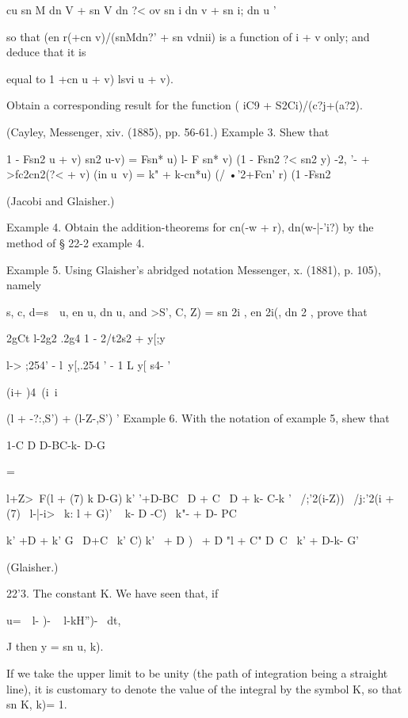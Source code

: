 cu sn M dn V + sn V dn ?< ov sn i  dn v + sn i; dn u ' 

so that (en r(+cn v)/(snMdn?' + sn vdnii) is a function of  i + v only; and deduce that it is 

equal to  1 +cn  u + v) lsvi u + v). 

Obtain a corresponding result for the function ( iC9 + S2Ci)/(c?j+(a?2). 

(Cayley, Messenger, xiv. (1885), pp. 56-61.) 
Example 3. Shew that 

1 - Fsn2  u + v) sn2  u-v) =    Fsn* u) l- F sn* v) (1 - Fsn2 ?< sn2 y) -2, 
 '- + >fc2cn2(?< + v) (in  u~v) =  k"  + k-cn*u) (/ •'2+Fcn'  r) (1 -Fsn2%

(Jacobi and Glaisher.) 

Example 4. Obtain the addition-theorems for cn(-w + r), dn(w-|-'i?) by the method of 
§ 22-2 example 4. 

Example 5. Using Glaisher's abridged notation  Messenger, x. (1881), p. 105), namely 

s, c, d=s\ \  u, en u, dn u, and >S', C, Z) = sn 2i , en 2i(, dn 2 , 
prove that 

2gCt  l-2g2 .2g4 1 - 2/t2s2 + y[;y 

l-> ;254'  - l\ y[,.254 '  - 1 L y[ s4- ' 

(i+ )4\ (i\  i 



(l + -?:,S')  + (l-Z-,S') ' 
Example 6. With the notation of example 5, shew that 

1-C  D D-BC-k-  D-G 



   = 



l+Z>~F(l + (7) k  D-G) k' '+D-BC 
 \  D + C \  D + k- C-k '  \  /;'2(i-Z)) \  /j:'2(i + (7) 
  ~l-|-i>~ k:  l + G)' ~ k- D -C)~ k"- + D- PC 

k' +D + k' G \  D+C \ k'   C) k'  \ + D ) 
\ + D "l + C" D~C ~k'  + D-k- G' 



(Glaisher.) 



22'3. The constant K. 
We have seen that, if 

u=\ \  l- )- ~ l-kH'')- ~dt, 

J 
then y = sn  u, k). 

If we take the upper limit to be unity (the path of integration being 
a straight line), it is customary to denote the value of the integral by the 
symbol K, so that sn  K, k)= 1. 

